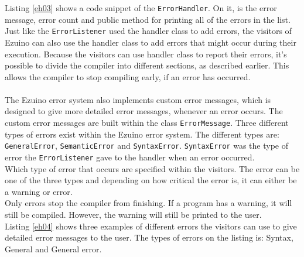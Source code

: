 Listing \ref{eh03} shows a code snippet of the \texttt{ErrorHandler}. On it, is the error message, error count and public method for printing all of the errors in the list.\\

\noindent\newline
Just like the \texttt{ErrorListener} used the handler class to add errors, the visitors of Ezuino can also use the handler class to add errors that might occur during their execution. Because the visitors can use handler class to report their errors, it's possible to divide the compiler into different sections, as described earlier. This allows the compiler to stop compiling early, if an error has occurred.
\\\\
The Ezuino error system also implements custom error messages, which is designed to give more detailed error messages, whenever an error occurs. The custom error messages are built within the class \texttt{ErrorMessage}. Three different types of errors exist within the Ezuino error system. The different types are: \texttt{GeneralError}, \texttt{SemanticError} and \texttt{SyntaxError}. \texttt{SyntaxError} was the type of error the \texttt{ErrorListener} gave to the handler when an error occurred.\\
Which type of error that occurs are specified within the visitors. The error can be one of the three types and depending on how critical the error is, it can either be a warning or error.\\
Only errors stop the compiler from finishing. If a program has a warning, it will still be compiled. However, the warning will still be printed to the user.\\
Listing \ref{eh04} shows three examples of different errors the visitors can use to give detailed error messages to the user. The types of errors on the listing is: Syntax, General and General error.

\noindent\newline